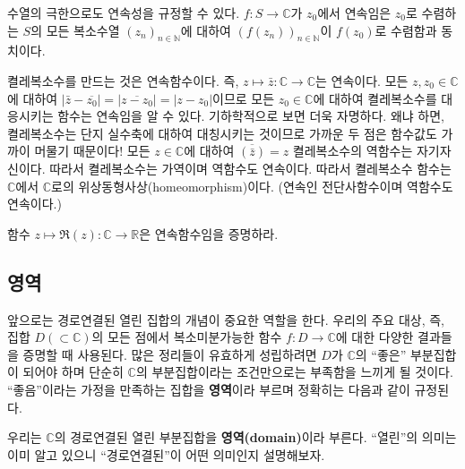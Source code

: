 수열의 극한으로도 연속성을 규정할 수 있다.
$f:S\to\mathbb C$가 $z_0$에서 연속임은
$z_0$로 수렴하는 $S$의 모든 복소수열 $(z_n)_{n\in\mathbb N}$에 대하여
$(f(z_n))_{n\in\mathbb N}$이 $f(z_0)$로 수렴함과 동치이다.

\begin{saltexample}[label=example-1-2] {}{}
켤레복소수를 만드는 것은 연속함수이다.
즉, $z\mapsto\bar z: \mathbb C \to \mathbb C$는 연속이다.
모든 $z, z_0 \in \mathbb C$에 대하여
$|\bar z - \overline{z_0}| = |\overline{z-z_0}| = |z-z_0|$이므로
모든 $z_0\in\mathbb C$에 대하여 켤레복소수를 대응시키는 함수는
연속임을 알 수 있다.
 기하학적으로 보면 더욱 자명하다. 왜냐 하면, 켤레복소수는 단지 실수축에 대하여 
대칭시키는 것이므로 가까운 두 점은 함수값도 가까이 머물기 때문이다!
\saltvskipex
모든 $z\in\mathbb C$에 대하여 $\overline{(\bar z)} = z$ 켤레복소수의
역함수는 자기자신이다. 따라서 켤레복소수는 가역이며 역함수도 연속이다.
따라서 켤레복소수 함수는 $\mathbb C$에서 $\mathbb C$로의 
위상동형사상(homeomorphism)이다. (연속인 전단사함수이며 역함수도 연속이다.)
\end{saltexample}

\begin{salt_exercise} \label{ex-1-28}
함수 $z\mapsto \Re(z): \mathbb C \to \mathbb R$은 연속함수임을 증명하라. 
\end{salt_exercise}

\subsection{영역 \label{sec-1-3-4}}

앞으로는  경로연결된 열린 집합의 개념이 중요한 역할을 한다.
우리의 주요 대상, 즉, 집합 $D(\subset \mathbb C)$의 모든 점에서
복소미분가능한 함수 $f:D\to\mathbb C$에 대한 다양한 결과들을 증명할 때 사용된다.
많은 정리들이 유효하게 성립하려면 $D$가 $\mathbb C$의 ``좋은'' 부분집합이 되어야 하며
단순히 $\mathbb C$의 부분집합이라는 조건만으로는 부족함을 느끼게 될 것이다.
``좋음''이라는 가정을 만족하는 집합을 \textbf{영역}이라 부르며 정확히는 다음과 같이 규정된다.

우리는 $\mathbb C$의 경로연결된 열린 부분집합을 \textbf{영역(domain)}이라 부른다.
``열린''의 의미는 이미 알고 있으니 ``경로연결된''이 어떤 의미인지 설명해보자.

